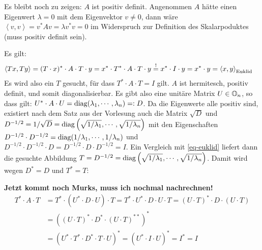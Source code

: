 Es bleibt noch zu zeigen: $A$ ist positiv definit. Angenommen $A$ hätte einen
Eigenwert $\lambda = 0$ mit dem Eigenvektor $v \ne 0$, dann wäre
$\left<v,v\right> = v^* A v = \lambda v^* v = 0$ im Widerspruch zur Definition
des Skalarpoduktes (muss positiv definit sein).

Es gilt:
\begin{align}
\label{eq-euklid}
  \left<T x,T y\right> &= (T\cdot x)^* \cdot A \cdot T \cdot y
    = x^* \cdot T^* \cdot A \cdot T  \cdot y \overset{!}{=}   x^* \cdot I \cdot y
    = x^* \cdot y =\left<x, y\right>_\text{Euklid}
\end{align}
Es wird also ein $T$ gesucht, für dass $T^* \cdot A \cdot T = I$ gilt. $A$ ist
hermitesch, positiv definit, und somit diagonalisierbar. Es gibt also eine
unitäre Matrix $U \in \mathbb O_n$, so dass gilt:
$U^* \cdot A \cdot U = \mathrm{diag}(\lambda_1, \cdots,\lambda_n) =: D$. Da die Eigenwerte alle
positiv sind, existiert nach dem Satz aus der Vorlesung auch die Matrix $\sqrt{D}$ und
$D^{-1/2} = 1 / \sqrt{D} = \mathrm{diag}\left(\sqrt{1 / \lambda_1}, \cdots, \sqrt{1 /\lambda_n}\right)$
mit den Eigenschaften $D^{-1/2} \cdot D^{-1/2} = \mathrm{diag}(1/\lambda_1, \cdots, 1/ \lambda_n)$
und $D^{-1/2} \cdot D^{-1/2} \cdot D = D^{-1/2} \cdot D \cdot D^{-1/2} = I$. Ein Vergleich
mit \eqref{eq-euklid} liefert dann die gesuchte Abbildung
$T =  D^{-1/2} =  \mathrm{diag}\left(\sqrt{1 / \lambda_1}, \cdots, \sqrt{1 /\lambda_n}\right)$.
Damit wird wegen $D^* = D$ und $T^* =  T$:

\textbf{Jetzt kommt noch Murks, muss ich nochmal nachrechnen!}
\begin{align*}
  \nonumber
  T^* \cdot A \cdot T &= T^* \cdot (U^* \cdot D \cdot U ) \cdot T =
  T^* \cdot U^* \cdot D \cdot U \cdot T
    = (U \cdot T)^* \cdot D \cdot (U \cdot T) \\
  &= \left ( (U \cdot T)^* \cdot D^* \cdot (U \cdot T)^{**}   \right)^* \\
  &= ( U^* \cdot T^* \cdot D^* \cdot T \cdot U )^* = (U^* \cdot I \cdot U)^* = I^* = I
\end{align*}
